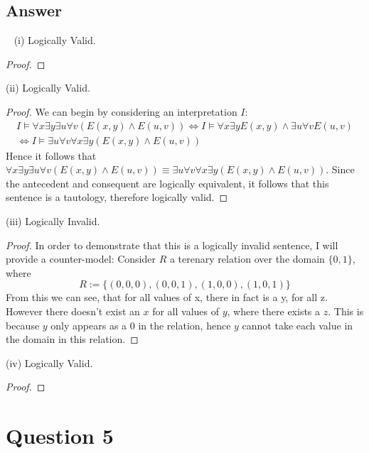 \documentclass[12pt]{fphw}
\begin{document}
\subsection*{Answer} \ \newline
(i) Logically Valid.
\begin{proof}
\end{proof}  \noindent
(ii) Logically Valid.
\begin{proof}
    We can begin by considering an interpretation $I$:
    \begin{gather*}
        I \models \forall x \exists y \exists u \forall v (E(x,y) \wedge E(u,v)) \iff I \models \forall x \exists y E(x,y) \wedge \exists u \forall v E(u, v) \\ 
        \iff I \models \exists u \forall v \forall x \exists y (E(x,y) \wedge E(u,v))
    \end{gather*}
    Hence it follows that $\forall x \exists y \exists u \forall v (E(x,y) \wedge E(u,v)) \equiv \exists u \forall v \forall x \exists y(E(x,y) \wedge E(u,v))$. Since the antecedent and consequent are logically equivalent, it follows that this sentence is a tautology, therefore logically valid.
\end{proof} \noindent
(iii) Logically Invalid.
\begin{proof}
In order to demonstrate that this is a logically invalid sentence, I will provide a counter-model: Consider $R$ a terenary relation over the domain $\{0, 1\}$, where
$$
R := \{(0,0,0),(0,0,1),(1,0,0),(1,0,1)\}
$$
From this we can see, that for all values of x, there in fact is a y, for all z. However there doesn't exist an $x$ for all values of $y$, where there exists a $z$. This is because $y$ only appears as a $0$ in the relation, hence $y$ cannot take each value in the domain in this relation.
\end{proof} \noindent
(iv) Logically Valid.
\begin{proof}
\end{proof} \noindent

\section*{Question 5}
\end{document}
